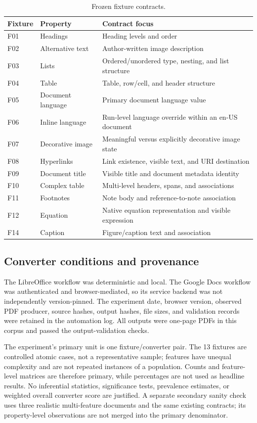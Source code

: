 \begin{table}[t]
\centering\small
\caption{Frozen fixture contracts.}
\label{tab:fixtures}
\begin{tabular}{p{}p{}p{}}
\hline
Fixture & Property & Contract focus \\
\hline
F01 & Headings & Heading levels and order \\
F02 & Alternative text & Author-written image description \\
F03 & Lists & Ordered/unordered type, nesting, and list structure \\
F04 & Table & Table, row/cell, and header structure \\
F05 & Document language & Primary document language value \\
F06 & Inline language & Run-level language override within an en-US document \\
F07 & Decorative image & Meaningful versus explicitly decorative image state \\
F08 & Hyperlinks & Link existence, visible text, and URI destination \\
F09 & Document title & Visible title and document metadata identity \\
F10 & Complex table & Multi-level headers, spans, and associations \\
F11 & Footnotes & Note body and reference-to-note association \\
F12 & Equation & Native equation representation and visible expression \\
F14 & Caption & Figure/caption text and association \\
\hline
\end{tabular}
\end{table}

\subsection{Converter conditions and provenance}

The LibreOffice workflow was deterministic and local. The Google Docs workflow was authenticated and browser-mediated, so its service backend was not independently version-pinned. The experiment date, browser version, observed PDF producer, source hashes, output hashes, file sizes, and validation records were retained in the automation log. All outputs were one-page PDFs in this corpus and passed the output-validation checks.

The experiment's primary unit is one fixture/converter pair. The 13 fixtures are controlled atomic cases, not a representative sample; features have unequal complexity and are not repeated instances of a population. Counts and feature-level matrices are therefore primary, while percentages are not used as headline results. No inferential statistics, significance tests, prevalence estimates, or weighted overall converter score are justified. A separate secondary sanity check uses three realistic multi-feature documents and the same existing contracts; its property-level observations are not merged into the primary denominator.

